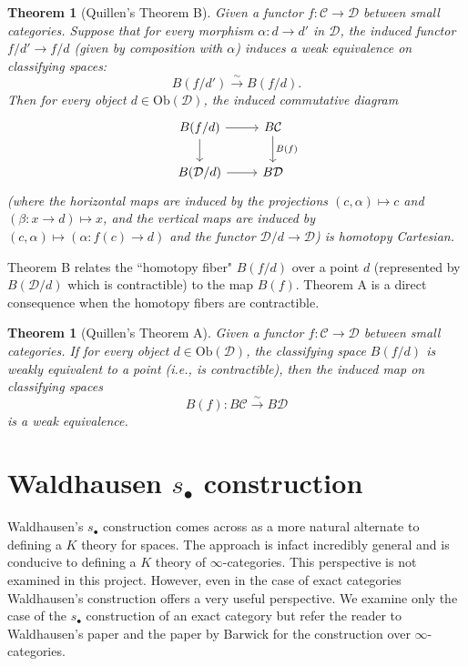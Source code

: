 \documentclass[12pt]{report}
\numberwithin{equation}{section}
\newtheorem{theorem}[dummy]{Theorem}
\begin{document}
	\begin{theorem}[Quillen's Theorem B]
		\label{thm:quillen_B}
		Given a functor $f: \mathcal{C} \to \mathcal{D}$ between small categories. Suppose that for every morphism $\alpha: d \to d'$ in $\mathcal{D}$, the induced functor $f/d' \to f/d$ (given by composition with $\alpha$) induces a weak equivalence on classifying spaces:
		\[ B(f/d') \xrightarrow{\sim} B(f/d). \]
		Then for every object $d \in \mathrm{Ob}(\mathcal{D})$, the induced commutative diagram
		\[
		\begin{tikzcd}
			B(f/d) \arrow{r} \arrow{d} & B\mathcal{C} \arrow{d}{B(f)} \\
			B(\mathcal{D}/d) \arrow{r} & B\mathcal{D}
		\end{tikzcd}
		\]
		(where the horizontal maps are induced by the projections $(c, \alpha) \mapsto c$ and $(\beta: x \to d) \mapsto x$, and the vertical maps are induced by $(c, \alpha) \mapsto (\alpha: f(c) \to d)$ and the functor $\mathcal{D}/d \to \mathcal{D}$) is homotopy Cartesian.
	\end{theorem}
	
	Theorem B relates the ``homotopy fiber" $B(f/d)$ over a point $d$ (represented by $B(\mathcal{D}/d)$ which is contractible) to the map $B(f)$. Theorem A is a direct consequence when the homotopy fibers are contractible.
	
	\begin{theorem}[Quillen's Theorem A]
		\label{thm:quillen_A}
		Given a functor $f: \mathcal{C} \to \mathcal{D}$ between small categories. If for every object $d \in \mathrm{Ob}(\mathcal{D})$, the classifying space $B(f/d)$ is weakly equivalent to a point (i.e., is contractible), then the induced map on classifying spaces
		\[ B(f): B\mathcal{C} \xrightarrow{\sim} B\mathcal{D} \]
		is a weak equivalence.
	\end{theorem}
	
	
	\chapter{Waldhausen \( s_\bullet \) construction}
	
	Waldhausen's \( s_\bullet \) construction comes across as a more natural alternate to defining a \( K \) theory for spaces. The approach is infact incredibly general and is conducive to defining a \( K \) theory of \( \infty \)-categories. This perspective is not examined in this project. However, even in the case of exact categories Waldhausen's construction offers a very useful perspective. We examine only the case of the \( s_\bullet \) construction of an exact category but refer the reader to Waldhausen's paper \cite{10.1007/BFb0074449} and the paper by Barwick \cite{Barwick_2016} for the construction over \( \infty \)-categories.
	
\end{document}
